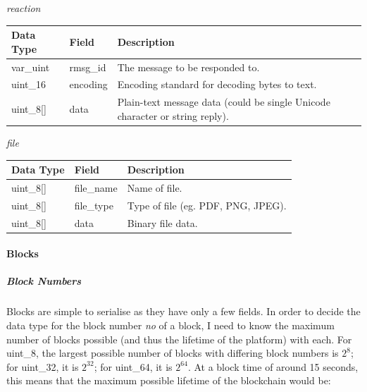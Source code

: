 \documentclass{article}
\begin{document}
\begin{center}
\newpage

\Large{\textit{reaction}}
\begin{table}[H]
\centering
\begin{tabular}{|p{1.3cm}|p{2.5cm}|p{6cm}|}
\hline
\rowcolor{tblgrey} 
Data Type       & Field           & Description                                               \\ \hline
var\_uint       & rmsg\_id         & The message to be responded to.                           \\ \hline
uint\_16        & encoding        & Encoding standard for decoding bytes to text.      \\ \hline
uint\_8[\hspace{0.05cm}] & data            & Plain-text message data (could be single Unicode character or string reply).      \\ \hline
\end{tabular}
\end{table}

\Large{\textit{file}}
\begin{table}[H]
\centering
\begin{tabular}{|p{1.3cm}|p{2.5cm}|p{6cm}|}
\hline
\rowcolor{tblgrey} 
Data Type       & Field           & Description                                               \\ \hline
uint\_8[\hspace{0.05cm}] & file\_name      & Name of file.                                             \\ \hline
uint\_8[\hspace{0.05cm}] & file\_type      & Type of file (eg. PDF, PNG, JPEG).                        \\ \hline
uint\_8[\hspace{0.05cm}] & data            & Binary file data.                                         \\ \hline
\end{tabular}
\end{table}

\end{center}

\paragraph{Blocks}
\subparagraph{Block Numbers}
Blocks are simple to serialise as they have only a few fields. In order to decide the data type for the block number \textit{no} of a block, I need to know the maximum number of blocks possible (and thus the lifetime of the platform) with each. For uint\_8, the largest possible number of blocks with differing block numbers is $2^{8}$; for uint\_32, it is $2^{32}$; for uint\_64, it is $2^{64}$. At a block time of around 15 seconds, this means that the maximum possible lifetime of the blockchain would be:
\end{document}
